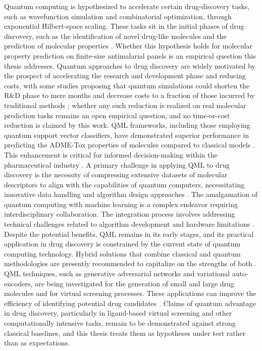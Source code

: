Quantum computing is hypothesized to accelerate certain drug-discovery tasks, such as wavefunction simulation and combinatorial optimization, through exponential Hilbert-space scaling. These tasks sit in the initial phases of drug discovery, such as the identification of novel drug-like molecules and the prediction of molecular properties \cite{Batra2021,Avramouli2023,Avramouli2022,Batra2020}. Whether this hypothesis holds for molecular property prediction on finite-size antimalarial panels is an empirical question this thesis addresses. Quantum approaches to drug discovery are widely motivated by the prospect of accelerating the research and development phase and reducing costs, with some studies proposing that quantum simulations could shorten the R\&D phase to mere months and decrease costs to a fraction of those incurred by traditional methods \cite{Wong2023}; whether any such reduction is realized on real molecular prediction tasks remains an open empirical question, and no time-or-cost reduction is claimed by this work. QML frameworks, including those employing quantum support vector classifiers, have demonstrated superior performance in predicting the ADME-Tox properties of molecules compared to classical models \cite{Bhatia2023}. This enhancement is critical for informed decision-making within the pharmaceutical industry \cite{Bhatia2023}. A primary challenge in applying QML to drug discovery is the necessity of compressing extensive datasets of molecular descriptors to align with the capabilities of quantum computers, necessitating innovative data handling and algorithm design approaches \cite{Batra2021,Bhatia2023}. The amalgamation of quantum computing with machine learning is a complex endeavor requiring interdisciplinary collaboration. The integration process involves addressing technical challenges related to algorithm development and hardware limitations \cite{Avramouli2022}. Despite the potential benefits, QML remains in its early stages, and its practical application in drug discovery is constrained by the current state of quantum computing technology. Hybrid solutions that combine classical and quantum methodologies are presently recommended to capitalize on the strengths of both \cite{Avramouli2023}. QML techniques, such as generative adversarial networks and variational auto-encoders, are being investigated for the generation of small and large drug molecules and for virtual screening processes. These applications can improve the efficiency of identifying potential drug candidates \cite{Mensa2023,Li2021a}. Claims of quantum advantage in drug discovery, particularly in ligand-based virtual screening and other computationally intensive tasks, remain to be demonstrated against strong classical baselines, and this thesis treats them as hypotheses under test rather than as expectations.

